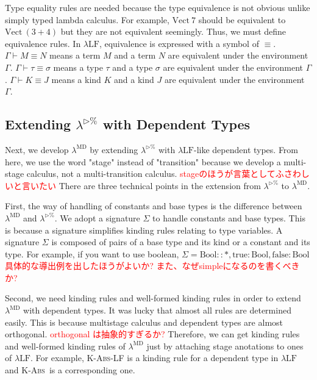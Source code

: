 \documentclass[runningheads]{llncs}
\newcommand{\red}[1]{\textcolor{red}{#1 }}
\newcommand{\LTP}{$\lambda^{\triangleright\%}$\xspace}
\newcommand{\LMD}{$\lambda^{\textrm{MD}}$\xspace}
\newcommand{\LLF}{$\lambda\textrm{LF}$\xspace}
\newcommand{\G}{\Gamma}
\newcommand{\V}{\vdash_\Sigma}
\newcommand{\E}{\equiv}
\newcommand{\KAbs}{\textsc{K-Abs}}
\newcommand{\B}{\textrm{Bool}}
\begin{document}
Type equality rules are needed because the type equivalence is not obvious unlike simply typed lambda calculus.
For example, $\textrm{Vect}\ 7$ should be equivalent to $\textrm{Vect}\ (3+4)$
but they are not equivalent seemingly. Thus, we must define equivalence rules.
In \LLF, equivalence is expressed with a symbol of $\E$.
$\G \vdash M \E N$ means a term $M$ and a term $N$ are equivalent under the environment $\G$.
$\G \vdash \tau \E \sigma$ means a type $\tau$ and a type $\sigma$ are equivalent under the environment $\G$.
$\G \vdash K \E J$ means a kind $K$ and a kind $J$ are equivalent under the environment $\G$.

\subsection{Extending \LTP with Dependent Types}

Next, we develop \LMD by extending \LTP with \LLF-like dependent types.
From here, we use the word "stage" instead of "transition" 
because we develop a multi-stage calculus, not a multi-transition calculus.
\red{stageのほうが言葉としてふさわしいと言いたい}
There are three technical points in the extension from \LTP to \LMD.


First, the way of handling of constants and base types is the difference between \LMD and \LTP.
We adopt a signature $\Sigma$ to handle constants and base types.
This is because a signature simplifies kinding rules relating to type variables.
A signature $\Sigma$ is composed of pairs of a base type and its kind or a constant and its type.
For example, if you want to use boolean, $\Sigma = \B::*, \text{true}:\B, \text{false}:\B$
\red{具体的な導出例を出したほうがよいか? また、なぜsimpleになるのを書くべきか?}


Second, we need kinding rules and well-formed kinding rules in order to extend \LMD with dependent types.
It was lucky that almost all rules are determined easily.
This is because multistage calculus and dependent types are almost orthogonal.
\red{orthogonal は抽象的すぎるか?}
Therefore, we can get kinding rules and well-formed kinding rules of \LMD just by 
attaching stage anotations to ones of \LLF.
For example, \KAbs-LF is a kinding rule for a dependent type in \LLF and \KAbs\ is a corresponding one.
\begin{center}
    \infrule{\G\vdash \tau :: * \andalso \G,x:\tau @A\vdash \sigma::J}{\G\vdash(\Pi x:\tau.\sigma) :: (\Pi x:\tau.J)}{\KAbs-LF} \\[2mm]
    \infrule{\G\V \tau :: *@A \andalso \G,x:\tau @A\V \sigma::J@A}{\G\V(\Pi x:\tau.\sigma) :: (\Pi x:\tau.J)@A}{\KAbs} \\[2mm]
\end{center}
\end{document}
